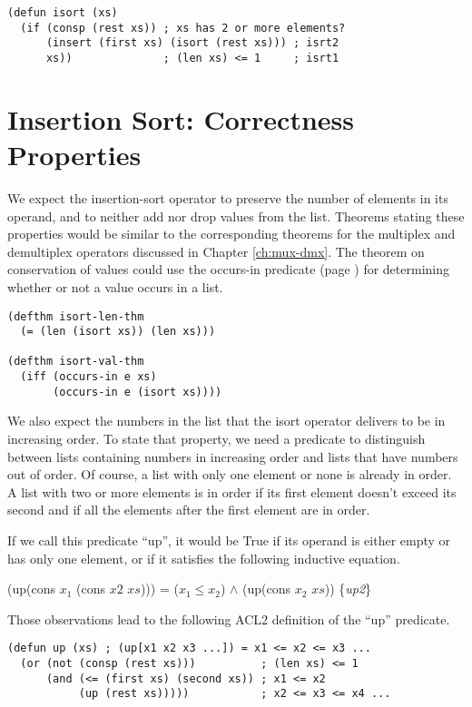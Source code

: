 \label{defun:isort}
\begin{Verbatim}
(defun isort (xs)
  (if (consp (rest xs)) ; xs has 2 or more elements?
      (insert (first xs) (isort (rest xs))) ; isrt2
      xs))              ; (len xs) <= 1     ; isrt1
\end{Verbatim}

\section{Insertion Sort: Correctness Properties}
\label{sec:insertion-sort-correctness}

We expect the insertion-sort operator to preserve
the number of elements in its operand, and to
neither add nor drop values from the list.
Theorems stating these properties would be
similar to the corresponding theorems for
the multiplex and demultiplex operators discussed
in Chapter \ref{ch:mux-dmx}.
The theorem on conservation of values
could use the occurs-in predicate
(page \pageref{def:occurs-in}) for determining
whether or not a value occurs in a list.

\label{defthm:isort-len}
\begin{Verbatim}
(defthm isort-len-thm
  (= (len (isort xs)) (len xs)))

(defthm isort-val-thm
  (iff (occurs-in e xs)
       (occurs-in e (isort xs))))
\end{Verbatim}
\label{defthm:isort-val}

We also expect the numbers in the list that the isort operator
delivers to be in increasing order.
To state that property, we need a predicate
to distinguish between lists containing numbers in increasing order
and lists that have numbers out of order.
Of course, a list with only one element or none is already
in order. A list with two or more elements is in order
if its first element doesn't exceed its second and if
all the elements after the first element are in order.

If we call this predicate ``up'', it would be True
if its operand is either empty or has only one element,
or if it satisfies the
following inductive equation.

\hspace{1cm} (up(cons $x_1$ (cons $x2$ $xs$))) = ($x_1 \le x_2$) $\wedge$ (up(cons $x_2$ $xs$))
\hfill \{\emph{up2}\}

Those observations lead to the following ACL2 definition of the ``up'' predicate.

\label{defun:up}
\begin{Verbatim}
(defun up (xs) ; (up[x1 x2 x3 ...]) = x1 <= x2 <= x3 ...
  (or (not (consp (rest xs)))          ; (len xs) <= 1
      (and (<= (first xs) (second xs)) ; x1 <= x2
           (up (rest xs)))))           ; x2 <= x3 <= x4 ...
\end{Verbatim}

